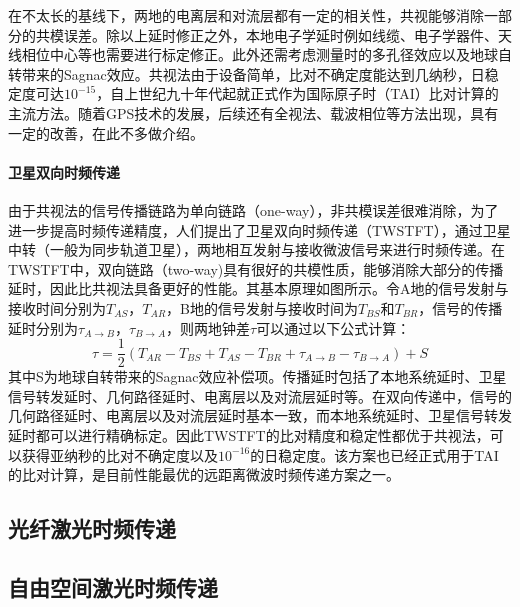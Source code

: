 在不太长的基线下，两地的电离层和对流层都有一定的相关性，共视能够消除一部分的共模误差。除以上延时修正之外，本地电子学延时例如线缆、电子学器件、天线相位中心等也需要进行标定修正。此外还需考虑测量时的多孔径效应以及地球自转带来的Sagnac效应。共视法由于设备简单，比对不确定度能达到几纳秒，日稳定度可达$10^{-15}$，自上世纪九十年代起就正式作为国际原子时（TAI）比对计算的主流方法。随着GPS技术的发展，后续还有全视法、载波相位等方法出现，具有一定的改善，在此不多做介绍。

\paragraph*{卫星双向时频传递}
由于共视法的信号传播链路为单向链路（one-way），非共模误差很难消除，为了进一步提高时频传递精度，人们提出了卫星双向时频传递（TWSTFT），通过卫星中转（一般为同步轨道卫星），两地相互发射与接收微波信号来进行时频传递。在TWSTFT中，双向链路（two-way)具有很好的共模性质，能够消除大部分的传播延时，因此比共视法具备更好的性能。其基本原理如图所示。令A地的信号发射与接收时间分别为$T_{AS}$，$T_{AR}$，B地的信号发射与接收时间为$T_{BS}$和$T_{BR}$，信号的传播延时分别为$\tau_{A \rightarrow B}$，$\tau_{B \rightarrow A}$，则两地钟差$\tau$可以通过以下公式计算：
\begin{equation}
\tau=\dfrac{1}{2}(T_{AR}-T_{BS}+T_{AS}-T_{BR}+\tau_{A \rightarrow B}-\tau_{B \rightarrow A})+S
\end{equation}
其中S为地球自转带来的Sagnac效应补偿项。传播延时包括了本地系统延时、卫星信号转发延时、几何路径延时、电离层以及对流层延时等。在双向传递中，信号的几何路径延时、电离层以及对流层延时基本一致，而本地系统延时、卫星信号转发延时都可以进行精确标定。因此TWSTFT的比对精度和稳定性都优于共视法，可以获得亚纳秒的比对不确定度以及$10^{-16}$的日稳定度。该方案也已经正式用于TAI的比对计算，是目前性能最优的远距离微波时频传递方案之一。

\subsection{光纤激光时频传递}

\subsection{自由空间激光时频传递}
